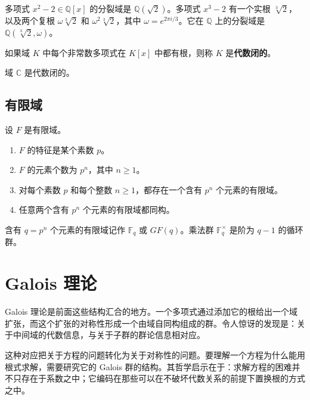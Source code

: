 \begin{example}
多项式 $x^2-2\in\mathbb{Q}[x]$ 的分裂域是 $\mathbb{Q}(\sqrt{2})$。多项式 $x^3-2$ 有一个实根 $\sqrt[3]{2}$，以及两个复根 $\omega\sqrt[3]{2}$ 和 $\omega^2\sqrt[3]{2}$，其中 $\omega=e^{2\pi i/3}$。它在 $\mathbb{Q}$ 上的分裂域是 $\mathbb{Q}(\sqrt[3]{2},\omega)$。
\end{example}

\begin{definition}[代数闭域]
如果域 $K$ 中每个非常数多项式在 $K[x]$ 中都有根，则称 $K$ 是\textbf{代数闭的}。
\end{definition}

\begin{theorem}[代数学基本定理]
域 $\mathbb{C}$ 是代数闭的。
\end{theorem}

\subsection{有限域}

\begin{theorem}[有限域的分类]
设 $F$ 是有限域。
\begin{enumerate}
    \item $F$ 的特征是某个素数 $p$。
    \item $F$ 的元素个数为 $p^n$，其中 $n\geq 1$。
    \item 对每个素数 $p$ 和每个整数 $n\geq 1$，都存在一个含有 $p^n$ 个元素的有限域。
    \item 任意两个含有 $p^n$ 个元素的有限域都同构。
\end{enumerate}
\end{theorem}

\begin{remark}
含有 $q=p^n$ 个元素的有限域记作 $\mathbb{F}_q$ 或 $GF(q)$。乘法群 $\mathbb{F}_q^\times$ 是阶为 $q-1$ 的循环群。
\end{remark}

\section{Galois 理论}


Galois 理论是前面这些结构汇合的地方。一个多项式通过添加它的根给出一个域扩张，而这个扩张的对称性形成一个由域自同构组成的群。令人惊讶的发现是：关于中间域的代数信息，与关于子群的群论信息相对应。

这种对应把关于方程的问题转化为关于对称性的问题。要理解一个方程为什么能用根式求解，需要研究它的 Galois 群的结构。其哲学启示在于：求解方程的困难并不只存在于系数之中；它编码在那些可以在不破坏代数关系的前提下置换根的方式之中。

